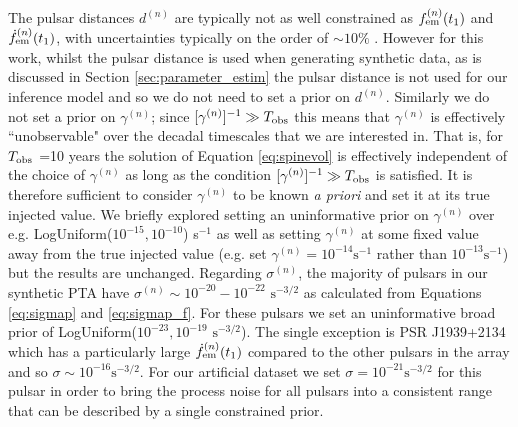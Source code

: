 \documentclass[fleqn,usenatbib,useAMS]{mnras}
\begin{document}
The pulsar distances $d^{(n)}$ are typically not as well constrained as $f_{\rm em}^{(n)} (t_1)$ and $\dot{f}_{\rm em}^{(n)} (t_1)$, with uncertainties typically on the order of $\sim 10 \%$ \citep{Arzoumanian2018ApJS..235...37A,Yao2017}. However for this work, whilst the pulsar distance is used when generating synthetic data, as is discussed in Section \ref{sec:parameter_estim} the pulsar distance is not used for our inference model and so we do not need to set a prior on $d^{(n)}$. Similarly we do not set a prior on $\gamma^{(n)}$; since $[\gamma^{(n)}]^{-1} \gg T_{\rm obs}$ this means that $\gamma^{(n)}$ is effectively ``unobservable" over the decadal timescales that we are interested in. That is, for $T_{\rm obs}$ =10 years the solution of Equation \eqref{eq:spinevol} is effectively independent of the choice of $\gamma^{(n)}$ as long as the condition $[\gamma^{(n)}]^{-1} \gg T_{\rm obs}$ is satisfied. It is therefore sufficient to consider $\gamma^{(n)}$ to be known \textit{a priori} and set it at its true injected value. We briefly explored setting an uninformative prior on $\gamma^{(n)}$ over e.g. LogUniform($10^{-15}, 10^{-10}$) s$^{-1}$ as well as setting $\gamma^{(n)}$ at some fixed value away from the true injected value (e.g. set $\gamma^{(n)} = 10^{-14} \text{s}^{-1}$ rather than $10^{-13} \text{s}^{-1}$) but the results are unchanged. Regarding $\sigma^{(n)}$, the majority of pulsars in our synthetic PTA have $\sigma^{(n)} \sim 10^{-20} - 10^{-22} \text{ s}^{-3/2}$ as calculated from Equations \eqref{eq:sigmap} and \eqref{eq:sigmap_f}. For these pulsars we set an uninformative broad prior of LogUniform($10^{-23}, 10^{-19}$ $\text{s}^{-3/2}$). The single exception is PSR J1939+2134 which has a particularly large $\dot{f}_{\rm em}^{(n)} (t_1)$ compared to the other pulsars in the array and so $\sigma \sim 10^{-16} \text{s}^{-3/2}$. For our artificial dataset we set $\sigma = 10^{-21} \text{s}^{-3/2}$ for this pulsar in order to bring the process noise for all pulsars into a consistent range that can be described by a single constrained prior. \newline 
\end{document}
